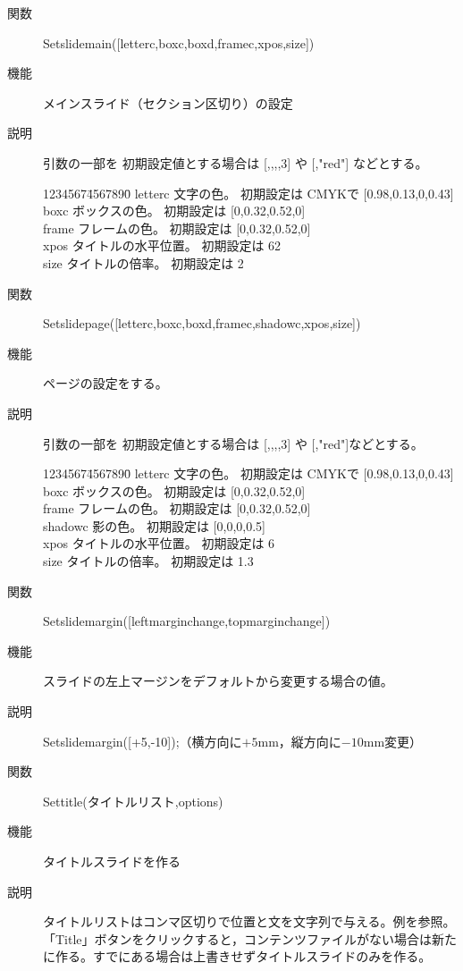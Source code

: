 \documentclass[papersize,a4paper,12pt,uplatex]{jsarticle}
\begin{document}
\begin{description}
\vspace{\baselineskip}
\hypertarget{setslidemain}{}
\item[関数]Setslidemain([letterc,boxc,boxd,framec,xpos,size])
\item[機能]メインスライド（セクション区切り）の設定
\item[説明]引数の一部を 初期設定値とする場合は [,,,,3] や [,"red"] などとする。
\begin{tabbing}
1234567\=4567890\=\kill
letterc \> 文字の色。 初期設定は CMYKで [0.98,0.13,0,0.43]\\
boxc \> ボックスの色。 初期設定は [0,0.32,0.52,0] \\
frame\> フレームの色。 初期設定は [0,0.32,0.52,0]\\
xpos \> タイトルの水平位置。 初期設定は 62\\
size \> タイトルの倍率。 初期設定は 2
\end{tabbing}


\vspace{\baselineskip}
\hypertarget{setslidepage}{}
\item[関数]Setslidepage([letterc,boxc,boxd,framec,shadowc,xpos,size])
\item[機能]ページの設定をする。
\item[説明]引数の一部を 初期設定値とする場合は [,,,,3] や [,"red"]などとする。

\begin{tabbing}
1234567\=4567890\=\kill
letterc \> 文字の色。 初期設定は CMYKで [0.98,0.13,0,0.43]\\
boxc \> ボックスの色。 初期設定は [0,0.32,0.52,0] \\
frame\> フレームの色。 初期設定は [0,0.32,0.52,0]\\
shadowc \> 影の色。 初期設定は [0,0,0,0.5]\\
xpos \> タイトルの水平位置。 初期設定は 6\\
size \> タイトルの倍率。 初期設定は 1.3
\end{tabbing}

\vspace{\baselineskip}
\hypertarget{setslidemargin}{}
\item[関数]Setslidemargin([leftmarginchange,topmarginchange])
\item[機能]スライドの左上マージンをデフォルトから変更する場合の値。
\item[説明]Setslidemargin([+5,-10]);（横方向に$+5$mm，縦方向に$-10$mm変更）

\vspace{\baselineskip}
\hypertarget{settitle}{}
\item[関数]Settitle(タイトルリスト,options)
\item[機能]タイトルスライドを作る
\item[説明]タイトルリストはコンマ区切りで位置と文を文字列で与える。例を参照。
「Title」ボタンをクリックすると，コンテンツファイルがない場合は新たに作る。すでにある場合は上書きせずタイトルスライドのみを作る。


\end{description}
\end{document}
